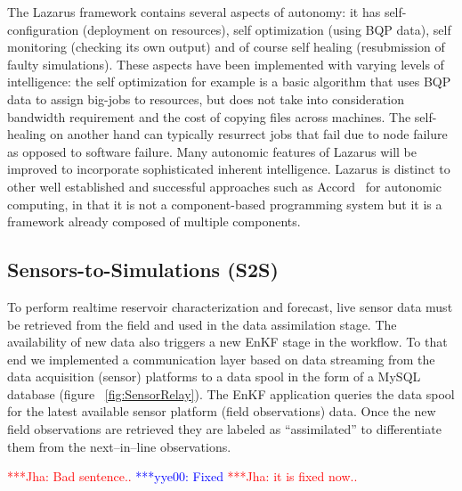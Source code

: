 \documentclass{acm_proc_article-sp}
\newcommand{\jhanote}[1]{ {\textcolor{red} { ***Jha: #1 }}}
\newcommand{\yyenote}[1]{ {\textcolor{blue} { ***yye00: #1 }}}
\newcommand{\jhanote}[1]{}
\newcommand{\yyenote}[1]{}
\begin{document}
The Lazarus framework contains several aspects of autonomy: it has
self-configuration (deployment on resources), self optimization (using
BQP data), self monitoring (checking its own output) and of course
self healing (resubmission of faulty simulations). These aspects have
been implemented with varying levels of intelligence: the self
optimization for example is a basic algorithm that uses BQP data to
assign big-jobs to resources, but does not take into consideration
bandwidth requirement and the cost of copying files across
machines. The self-healing on another hand can typically resurrect
jobs that fail due to node failure as opposed to software
failure. Many autonomic features of Lazarus will be improved to
incorporate sophisticated inherent intelligence.  Lazarus is distinct
to other well established and successful approaches such as
Accord~\cite{accord} for autonomic computing, in that it is not a
component-based programming system but it is a framework already
composed of multiple components.


\subsection{Sensors-to-Simulations (S2S)} 

To perform realtime reservoir characterization and forecast, live
sensor data must be retrieved from the field and used in the data
assimilation stage. The availability of new data also triggers a new
EnKF stage in the workflow. To that end we implemented a communication
layer based on data streaming from the data acquisition (sensor)
platforms to a data spool in the form of a MySQL database (figure
~\ref{fig:SensorRelay}). The EnKF application queries the data
spool for the latest available sensor platform (field observations)
data. Once the new field observations are retrieved they are labeled
as ``assimilated'' to differentiate them from the next--in--line
observations.  

\jhanote{Bad sentence..} \yyenote{Fixed} \jhanote{it is fixed now..}

\end{document}
